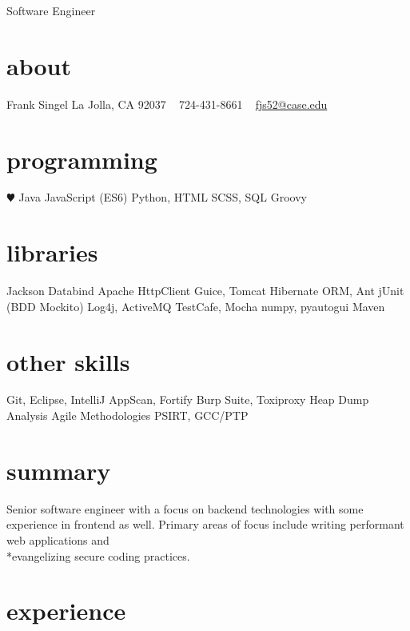 \documentclass[]{friggeri-cv}
\begin{document}
       {Software Engineer}


\begin{aside}
  \section{about}
    Frank Singel
    La Jolla, CA
    92037
    ~
    724-431-8661
    ~
    \href{mailto:fjs52@case.edu}{fjs52@case.edu}
  \section{programming}
    {\color{red} $\varheartsuit$} Java
    JavaScript (ES6)
    Python, HTML
    SCSS, SQL
    Groovy
  \section{libraries}
    Jackson Databind
    Apache HttpClient 
    Guice, Tomcat
    Hibernate ORM, Ant
    jUnit (BDD Mockito)
    Log4j, ActiveMQ
    TestCafe, Mocha
    numpy, pyautogui
    Maven
  \section{other skills}
    Git, Eclipse, IntelliJ
    AppScan, Fortify
    Burp Suite, Toxiproxy
    Heap Dump Analysis
    Agile Methodologies 
    PSIRT, GCC/PTP
    
\end{aside}

\section{summary}
Senior software engineer with a focus on backend technologies with some experience in frontend as well. Primary areas of focus include writing performant web applications and \\*evangelizing secure coding practices.

\section{experience}
\end{document}
